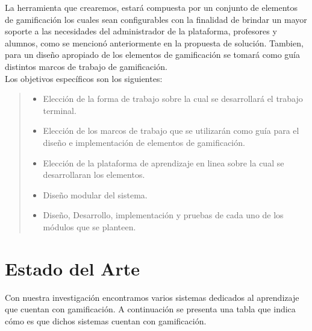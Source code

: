 \noindent La herramienta que crearemos, estará compuesta por un conjunto de elementos de gamificación los cuales sean configurables con la finalidad de brindar un mayor soporte a las necesidades del administrador de la plataforma, profesores y alumnos, como se mencionó anteriormente en la propuesta de solución. Tambien, para un diseño apropiado de los elementos de gamificación se tomará como guía distintos marcos de trabajo de gamificación.\\

Los objetivos específicos son los siguientes:

    \begin{quote}
    \begin{itemize}%
        \item Elección de la forma de trabajo sobre la cual se
              desarrollará el trabajo terminal.
              
        \item Elección de los marcos de trabajo que se utilizarán como
              guía para el diseño e implementación de elementos de gamificación.
        
        \item Elección de la plataforma de aprendizaje en linea sobre
              la cual se desarrollaran los elementos.
              
        \item Diseño modular del sistema.
        
        \item Diseño, Desarrollo, implementación y pruebas de cada uno de
              los módulos que se planteen.
    \end{itemize}
    \end{quote}

    

\section{Estado del Arte}
\label{sec:estadoArte}

    
Con nuestra investigación encontramos varios sistemas dedicados al aprendizaje que cuentan con gamificación. A continuación se presenta una tabla que indica cómo es que dichos sistemas cuentan con gamificación.
   
